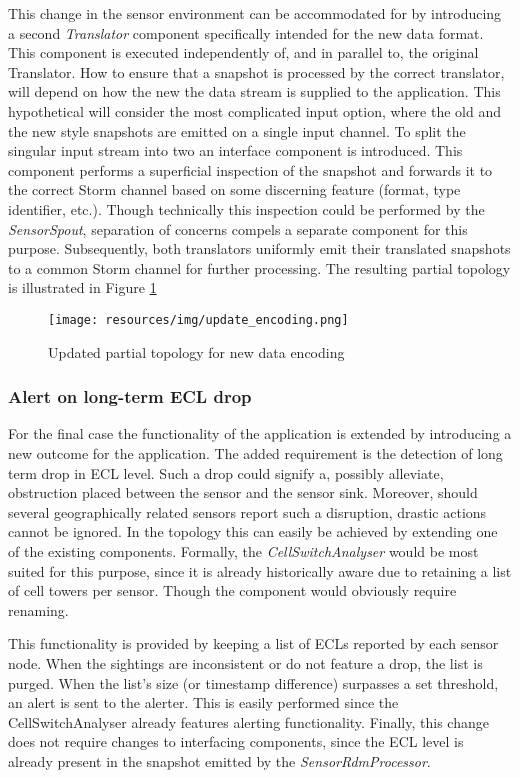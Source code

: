 This change in the sensor environment can be accommodated for by introducing a second \emph{Translator} component specifically intended for the new data format. This component is executed independently of, and in parallel to, the original Translator. How to ensure that a snapshot is processed by the correct translator, will depend on how the new the data stream is supplied to the application. This hypothetical will consider the most complicated input option, where the old and the new style snapshots are emitted on a single input channel. To split the singular input stream into two an interface component is introduced. This component performs a superficial inspection of the snapshot and forwards it to the correct Storm channel based on some discerning feature (format, type identifier, etc.). Though technically this inspection could be performed by the \emph{SensorSpout}, separation of concerns compels a separate component for this purpose. Subsequently, both translators uniformly emit their translated snapshots to a common Storm channel for further processing. The resulting partial topology is illustrated in Figure \ref{fig:update_encoding}

\begin{figure}
\centering
\texttt{[image: resources/img/update\_encoding.png]}
\caption{Updated partial topology for new data encoding}
\label{fig:update_encoding}
\end{figure}

\subsubsection{Alert on long-term ECL drop}
For the final case the functionality of the application is extended by introducing a new outcome for the application. The added requirement is the detection of long term drop in ECL level. Such a drop could signify a, possibly alleviate, obstruction placed between the sensor and the sensor sink. Moreover, should several geographically related sensors report such a disruption, drastic actions cannot be ignored. In the topology this can easily be achieved by extending one of the existing components. Formally, the \emph{CellSwitchAnalyser} would be most suited for this purpose, since it is already historically aware due to retaining a list of cell towers per sensor. Though the component would obviously require renaming.

This functionality is provided by keeping a list of ECLs reported by each sensor node. When the sightings are inconsistent or do not feature a drop, the list is purged. When the list's size (or timestamp difference) surpasses a set threshold, an alert is sent to the alerter. This is easily performed since the CellSwitchAnalyser already features alerting functionality. Finally, this change does not require changes to interfacing components, since the ECL level is already present in the snapshot emitted by the \emph{SensorRdmProcessor}.

